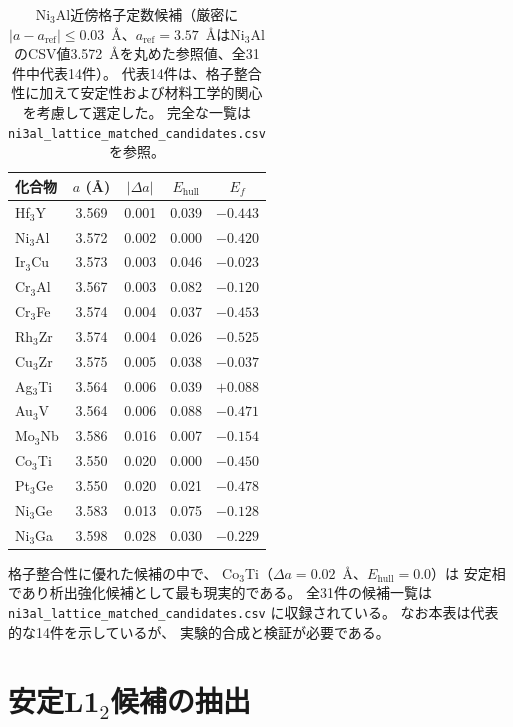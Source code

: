 \documentclass[5p,twocolumn]{elsarticle}
\begin{document}
\begin{table}[htbp]
  \centering
  \caption{Ni$_3$Al近傍格子定数候補（厳密に$|a - a_{\text{ref}}| \leq 0.03$~\AA、$a_{\text{ref}} = 3.57$~\AA{}はNi$_3$AlのCSV値3.572~\AA{}を丸めた参照値、全31件中代表14件）。
  代表14件は、格子整合性に加えて安定性および材料工学的関心を考慮して選定した。
  完全な一覧は \texttt{ni3al\_lattice\_matched\_candidates.csv} を参照。}
  \label{tab:sup_lattice_match}
  \small
  \begin{tabular}{lcccc}
    \toprule
    化合物 & $a$ (\AA) & $|\Delta a|$ & $E_\text{hull}$ & $E_f$ \\
    \midrule
    Hf$_3$Y & 3.569 & 0.001 & 0.039 & $-0.443$ \\
    Ni$_3$Al & 3.572 & 0.002 & 0.000 & $-0.420$ \\
    Ir$_3$Cu & 3.573 & 0.003 & 0.046 & $-0.023$ \\
    Cr$_3$Al & 3.567 & 0.003 & 0.082 & $-0.120$ \\
    Cr$_3$Fe & 3.574 & 0.004 & 0.037 & $-0.453$ \\
    Rh$_3$Zr & 3.574 & 0.004 & 0.026 & $-0.525$ \\
    Cu$_3$Zr & 3.575 & 0.005 & 0.038 & $-0.037$ \\
    Ag$_3$Ti & 3.564 & 0.006 & 0.039 & $+0.088$ \\
    Au$_3$V & 3.564 & 0.006 & 0.088 & $-0.471$ \\
    Mo$_3$Nb & 3.586 & 0.016 & 0.007 & $-0.154$ \\
    Co$_3$Ti & 3.550 & 0.020 & 0.000 & $-0.450$ \\
    Pt$_3$Ge & 3.550 & 0.020 & 0.021 & $-0.478$ \\
    Ni$_3$Ge & 3.583 & 0.013 & 0.075 & $-0.128$ \\
    Ni$_3$Ga & 3.598 & 0.028 & 0.030 & $-0.229$ \\
    \bottomrule
  \end{tabular}
\end{table}

格子整合性に優れた候補の中で、
Co$_3$Ti（$\Delta a = 0.02$~\AA、$E_\text{hull} = 0.0$）は
安定相であり析出強化候補として最も現実的である。
全31件の候補一覧は \texttt{ni3al\_lattice\_matched\_candidates.csv} に収録されている。
なお本表は代表的な14件を示しているが、
実験的合成と検証が必要である。

\section{安定L1$_2$候補の抽出}
\label{sec:sup_stable_l12}
\end{document}
